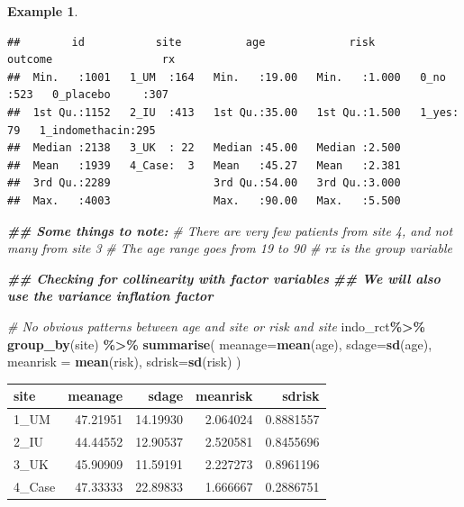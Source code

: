 \documentclass[
  openany]{book}
\newenvironment{Shaded}{\begin{snugshade}}{\end{snugshade}}
\newcommand{\AttributeTok}[1]{\textcolor[rgb]{0.13,0.29,0.53}{#1}}
\newcommand{\CommentTok}[1]{\textcolor[rgb]{0.56,0.35,0.01}{\textit{#1}}}
\newcommand{\DocumentationTok}[1]{\textcolor[rgb]{0.56,0.35,0.01}{\textbf{\textit{#1}}}}
\newcommand{\FunctionTok}[1]{\textcolor[rgb]{0.13,0.29,0.53}{\textbf{#1}}}
\newcommand{\NormalTok}[1]{#1}
\newcommand{\SpecialCharTok}[1]{\textcolor[rgb]{0.81,0.36,0.00}{\textbf{#1}}}
\theoremstyle{definition}
\theoremstyle{definition}
\newtheorem{example}{Example}[chapter]
\theoremstyle{definition}
\theoremstyle{definition}
\theoremstyle{remark}
\begin{document}
\begin{example}
\begin{verbatim}
##        id           site          age             risk        outcome                 rx     
##  Min.   :1001   1_UM  :164   Min.   :19.00   Min.   :1.000   0_no :523   0_placebo     :307  
##  1st Qu.:1152   2_IU  :413   1st Qu.:35.00   1st Qu.:1.500   1_yes: 79   1_indomethacin:295  
##  Median :2138   3_UK  : 22   Median :45.00   Median :2.500                                   
##  Mean   :1939   4_Case:  3   Mean   :45.27   Mean   :2.381                                   
##  3rd Qu.:2289                3rd Qu.:54.00   3rd Qu.:3.000                                   
##  Max.   :4003                Max.   :90.00   Max.   :5.500
\end{verbatim}

\begin{Shaded}
\begin{Highlighting}[]
\DocumentationTok{\#\# Some things to note:}
\CommentTok{\# There are very few patients from site 4, and not many from site 3}
\CommentTok{\# The age range goes from 19 to 90 }
\CommentTok{\# \textquotesingle{}rx\textquotesingle{} is the group variable}

\DocumentationTok{\#\# Checking for collinearity with factor variables}
\DocumentationTok{\#\# We will also use the variance inflation factor}

\CommentTok{\# No obvious patterns between age and site or risk and site}
\NormalTok{indo\_rct}\SpecialCharTok{\%\textgreater{}\%}
  \FunctionTok{group\_by}\NormalTok{(site) }\SpecialCharTok{\%\textgreater{}\%} 
  \FunctionTok{summarise}\NormalTok{(}
    \AttributeTok{meanage=}\FunctionTok{mean}\NormalTok{(age), }\AttributeTok{sdage=}\FunctionTok{sd}\NormalTok{(age),}
    \AttributeTok{meanrisk =} \FunctionTok{mean}\NormalTok{(risk), }\AttributeTok{sdrisk=}\FunctionTok{sd}\NormalTok{(risk)}
\NormalTok{    )}
\end{Highlighting}
\end{Shaded}

\begin{tabular}{l|r|r|r|r}
\hline
site & meanage & sdage & meanrisk & sdrisk\\
\hline
1\_UM & 47.21951 & 14.19930 & 2.064024 & 0.8881557\\
\hline
2\_IU & 44.44552 & 12.90537 & 2.520581 & 0.8455696\\
\hline
3\_UK & 45.90909 & 11.59191 & 2.227273 & 0.8961196\\
\hline
4\_Case & 47.33333 & 22.89833 & 1.666667 & 0.2886751\\
\hline
\end{tabular}


\end{example}
\end{document}
